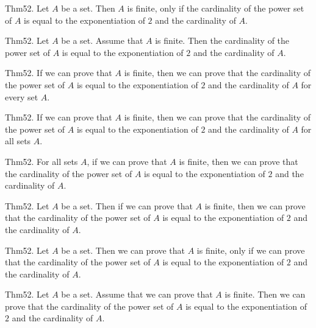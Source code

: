 \documentclass{article}
\begin{document}
Thm52. Let $A$ be a set. Then $A$ is finite, only if the cardinality of the power set of $A$ is equal to the exponentiation of $2$ and the cardinality of $A$.

Thm52. Let $A$ be a set. Assume that $A$ is finite. Then the cardinality of the power set of $A$ is equal to the exponentiation of $2$ and the cardinality of $A$.

Thm52. If we can prove that $A$ is finite, then we can prove that the cardinality of the power set of $A$ is equal to the exponentiation of $2$ and the cardinality of $A$ for every set $A$.

Thm52. If we can prove that $A$ is finite, then we can prove that the cardinality of the power set of $A$ is equal to the exponentiation of $2$ and the cardinality of $A$ for all sets $A$.

Thm52. For all sets $A$, if we can prove that $A$ is finite, then we can prove that the cardinality of the power set of $A$ is equal to the exponentiation of $2$ and the cardinality of $A$.

Thm52. Let $A$ be a set. Then if we can prove that $A$ is finite, then we can prove that the cardinality of the power set of $A$ is equal to the exponentiation of $2$ and the cardinality of $A$.

Thm52. Let $A$ be a set. Then we can prove that $A$ is finite, only if we can prove that the cardinality of the power set of $A$ is equal to the exponentiation of $2$ and the cardinality of $A$.

Thm52. Let $A$ be a set. Assume that we can prove that $A$ is finite. Then we can prove that the cardinality of the power set of $A$ is equal to the exponentiation of $2$ and the cardinality of $A$.
\end{document}
